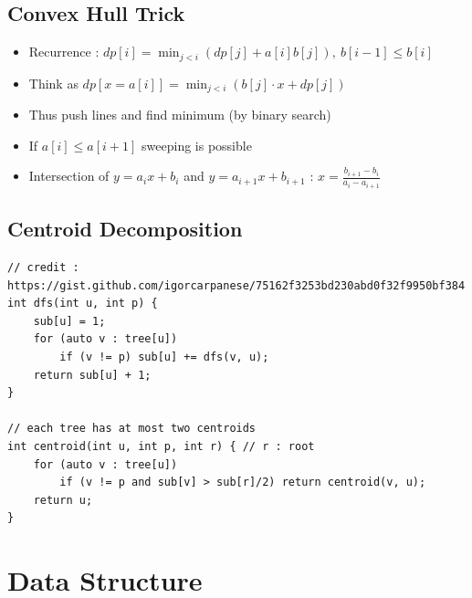 \documentclass[landscape, 8pt, a4paper, oneside, twocolumn]{extarticle}
\newcommand{\added}{Should be \textcolor{red}{\textbf{added}}.}
\begin{document}
\subsection{Convex Hull Trick}
\begin{itemize}
\item Recurrence : $ dp[i] = \min_{j<i} (dp[j] + a[i]b[j]),\ b[i-1] \leq b[i] $
\item Think as $ dp[x = a[i]] = \min_{j<i}(b[j] \cdot x + dp[j]) $
\item Thus push lines and find minimum (by binary search)
\item If $ a[i] \leq a[i+1] $ sweeping is possible
\item Intersection of $ y = a_ix +b_i $ and $ y = a_{i+1}x + b_{i+1} $ : $ x = \frac{b_{i+1}-b_i}{a_i-a_{i+1}} $
\end{itemize}

\subsection{Centroid Decomposition}
\begin{verbatim}
// credit : https://gist.github.com/igorcarpanese/75162f3253bd230abd0f32f9950bf384
int dfs(int u, int p) {
    sub[u] = 1;
    for (auto v : tree[u])
        if (v != p) sub[u] += dfs(v, u);
    return sub[u] + 1;
}

// each tree has at most two centroids
int centroid(int u, int p, int r) { // r : root
    for (auto v : tree[u])
        if (v != p and sub[v] > sub[r]/2) return centroid(v, u);
    return u;
}
\end{verbatim}


\section{Data Structure}
\end{document}
